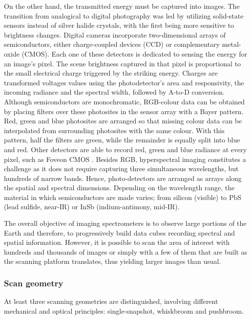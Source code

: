 On the other hand, the transmitted energy must be captured into images. The transition from analogical to digital photography was led by utilizing solid-state sensors instead of silver halide crystals, with the first being more sensitive to brightness changes. Digital cameras incorporate two-dimensional arrays of semiconductors, either charge-coupled devices (CCD) or complementary metal-oxide (CMOS). Each one of these detectors is dedicated to sensing the energy for an image's pixel. The scene brightness captured in that pixel is proportional to the small electrical charge triggered by the striking energy. Charges are transformed voltages values using the photodetector's area and responsivity, the incoming radiance and the spectral width, followed by A-to-D conversion. Although semiconductors are monochromatic, RGB-colour data can be obtained by placing filters over these photosites in the sensor array with a Bayer pattern. Red, green and blue photosites are arranged so that missing colour data can be interpolated from surrounding photosites with the same colour. With this pattern, half the filters are green, while the remainder is equally split into blue and red. Other detectors are able to record red, green and blue radiance at every pixel, such as Foveon CMOS \cite{lillesand_remote_2015}. Besides RGB, hyperspectral imaging constitutes a challenge as it does not require capturing three simultaneous wavelengths, but hundreds of narrow bands. Hence, photo-detectors are arranged as arrays along the spatial and spectral dimensions. Depending on the wavelength range, the material in which semiconductors are made varies; from silicon (visible) to PbS (lead sulfide, near-IR) or InSb (indium-antimony, mid-IR). 

The overall objective of imaging spectrometers is to observe large portions of the Earth and therefore, to progressively build data cubes recording spectral and spatial information. However, it is possible to scan the area of interest with hundreds and thousands of images or simply with a few of them that are built as the scanning platform translates, thus yielding larger images than usual. 

\subsubsection{Scan geometry}

At least three scanning geometries are distinguished, involving different mechanical and optical principles: single-snapshot, whiskbroom and pushbroom.

